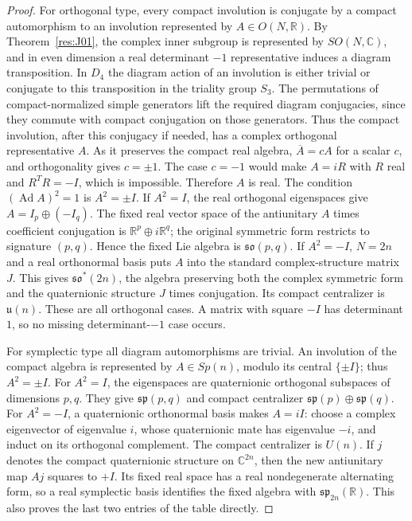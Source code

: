 \begin{proof}
For orthogonal type, every compact involution is conjugate by a
compact automorphism to an involution represented by
\(A\in O(N,\mathbb R)\). By Theorem~\ref{res:J01}, the complex
inner subgroup is represented by \(SO(N,\mathbb C)\), and
in even dimension a real determinant \(-1\) representative
induces a diagram transposition. In \(D_4\) the diagram action
of an involution is either trivial or conjugate to this
transposition in the triality group \(S_3\). The permutations
of compact-normalized simple generators lift the required
diagram conjugacies, since they commute with compact conjugation
on those generators. Thus the compact involution, after this
conjugacy if needed, has a complex orthogonal representative \(A\).
As it preserves the compact real algebra, \(\overline A=cA\)
for a scalar \(c\), and orthogonality gives \(c=\pm1\).
The case \(c=-1\) would make \(A=iR\) with \(R\) real and
\(R^TR=-I\), which is impossible. Therefore \(A\) is real.
The condition \((\operatorname{Ad}A)^2=1\) is \(A^2=\pm I\).
If \(A^2=I\), the real orthogonal eigenspaces give
\(A=I_p\oplus(-I_q)\). The fixed real vector space of
the antiunitary \(A\) times coefficient conjugation is
\(\mathbb R^p\oplus i\mathbb R^q\); the original symmetric
form restricts to signature \((p,q)\). Hence the fixed
Lie algebra is \(\mathfrak{so}(p,q)\).
If \(A^2=-I\), \(N=2n\) and a real orthonormal basis
puts \(A\) into the standard complex-structure matrix
\(J\). This gives \(\mathfrak{so}^*(2n)\), the algebra
preserving both the complex symmetric form and the
quaternionic structure \(J\) times conjugation. Its
compact centralizer is \(\mathfrak u(n)\).
These are all orthogonal cases. A matrix with square
\(-I\) has determinant \(1\), so no missing
determinant-\(-1\) case occurs.

For symplectic type all diagram automorphisms are trivial.
An involution of the compact algebra is represented by
\(A\in Sp(n)\), modulo its central \(\{\pm I\}\);
thus \(A^2=\pm I\). For \(A^2=I\), the eigenspaces
are quaternionic orthogonal subspaces of dimensions
\(p,q\). They give
\(\mathfrak{sp}(p,q)\) and compact centralizer
\(\mathfrak{sp}(p)\oplus\mathfrak{sp}(q)\).
For \(A^2=-I\), a quaternionic orthonormal basis makes
\(A=iI\): choose a complex eigenvector of eigenvalue
\(i\), whose quaternionic mate has eigenvalue \(-i\),
and induct on its orthogonal complement.
The compact centralizer is \(U(n)\).
If \(j\) denotes the compact quaternionic structure on
\(\mathbb C^{2n}\), then the new antiunitary map \(Aj\)
squares to \(+I\). Its fixed real space has a real
nondegenerate alternating form, so a real symplectic
basis identifies the fixed algebra with
\(\mathfrak{sp}_{2n}(\mathbb R)\).
This also proves the last two entries of the table directly.


\end{proof}

